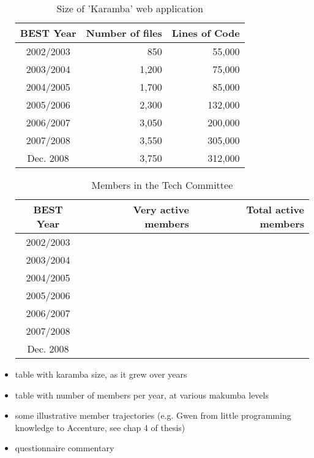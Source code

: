 \documentclass{acm_proc_article-sp}
\begin{document}
\begin{itemize}

\begin{table}\label{tab:karamba}
	\centering
	\caption{Size of 'Karamba' web application}
	\begin{tabular}{c|r|r}
		\hline
		\hline
		BEST Year 		& Number of files 	& Lines of Code\\
		\hline
		\hline
		2002/2003		& 850				& 55,000 \\
		\hline
		2003/2004		& 1,200				& 75,000 \\
		\hline
		2004/2005		& 1,700				& 85,000 \\
		\hline
		2005/2006		& 2,300				& 132,000 \\
		\hline
		2006/2007		& 3,050				& 200,000 \\
		\hline
		2007/2008		& 3,550				& 305,000 \\
		\hline
		Dec. 2008		& 3,750				& 312,000 \\
		\hline
		\hline
	\end{tabular}
\end{table} 


\begin{table}\label{tab:itd-members}
	\centering
	\caption{Members in the Tech Committee}
	\begin{tabular}{c|r|r}
		\hline
		\hline
		BEST Year 		& Very active members 	& Total active members 	\\
		\hline
		\hline
		2002/2003		& 						&  \\
		\hline
		2003/2004		& 						&  \\
		\hline
		2004/2005		& 						&  \\
		\hline
		2005/2006		& 						&  \\
		\hline
		2006/2007		& 						&  \\
		\hline
		2007/2008		& 						&  \\
		\hline
		Dec. 2008		& 						&  \\
		\hline
		\hline
	\end{tabular}
\end{table} 

\item table with karamba size, as it grew over years
\item table with number of members per year, at various makumba levels
\item some illustrative member trajectories (e.g. Gwen from little programming knowledge to Accenture, see chap 4 of thesis)
\item questionnaire commentary
\end{itemize}
\end{document}

